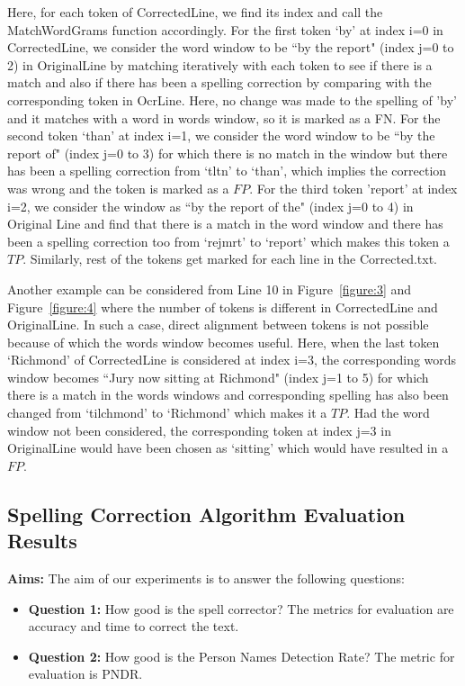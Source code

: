 \documentclass[letterpaper,11pt]{report}
\begin{document}
Here, for each token of CorrectedLine, we find its index and call the MatchWordGrams function accordingly. For the first token `by' at index i=0 in CorrectedLine, we consider the word window to be ``by the report" (index j=0 to 2) in OriginalLine by matching iteratively with each token to see if there is a match and also if there has been a spelling correction by comparing with the corresponding token in OcrLine. Here, no change was made to the spelling of 'by' and it matches with a word in words window, so it is marked as a FN. For the second token `than' at index i=1, we consider the word window to be ``by the report of" (index j=0 to 3) for which there is no match in the window but there has been a spelling correction from `tltn' to `than', which implies the correction was wrong and the token is marked as a $FP$. For the third token 'report' at index i=2, we consider the window as ``by the report of the" (index j=0 to 4) in Original Line and find that there is a match in the word window and there has been a spelling correction too from `rejmrt' to `report' which makes this token a $TP$. Similarly, rest of the tokens get marked for each line in the Corrected.txt. 

Another example can be considered from Line 10 in Figure~\ref{figure:3} and Figure~\ref{figure:4} where the number of tokens is different in CorrectedLine and OriginalLine. In such a case, direct alignment between tokens is not possible because of which the words window becomes useful. Here, when the last token `Richmond' of CorrectedLine is considered at index i=3, the corresponding words window becomes ``Jury now sitting at Richmond" (index j=1 to 5) for which there is a match in the words windows and corresponding spelling has also been changed from `tilchmond' to `Richmond' which makes it a $TP$. Had the word window not been considered, the corresponding token at index j=3 in OriginalLine would have been chosen as `sitting' which would have resulted in a $FP$. 
   


\subsection{Spelling Correction Algorithm Evaluation Results}
\label{spell:eval}

\noindent \textbf{Aims: }The aim of our experiments is to answer the following questions:
\begin{itemize}
\item \textbf{Question 1: }How good is the spell corrector? The metrics for evaluation are accuracy and time to correct the text.
 
\item \textbf{Question 2: }How good is the Person Names Detection Rate? The metric for evaluation is PNDR. 

\end{itemize}
\end{document}
